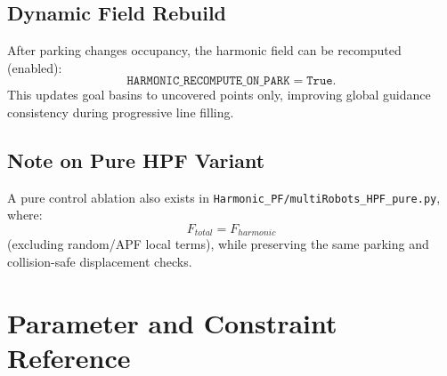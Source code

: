 \documentclass[11pt,a4paper]{article}
\begin{document}
\subsection{Dynamic Field Rebuild}
After parking changes occupancy, the harmonic field can be recomputed (enabled):
\begin{equation}
    \texttt{HARMONIC\_RECOMPUTE\_ON\_PARK}=\texttt{True}.
\end{equation}
This updates goal basins to uncovered points only, improving global guidance consistency during progressive line filling.

\subsection{Note on Pure HPF Variant}
A pure control ablation also exists in \texttt{Harmonic\_PF/multiRobots\_HPF\_pure.py}, where:
\begin{equation}
    F_{total}=F_{harmonic}
\end{equation}
(excluding random/APF local terms), while preserving the same parking and collision-safe displacement checks.

\section{Parameter and Constraint Reference}
\end{document}
